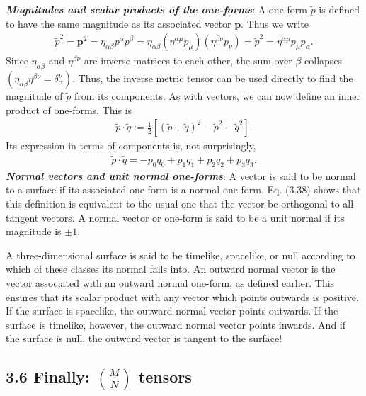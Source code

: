 \documentclass[11pt,letterpaper]{book}
\begin{document}
    \textit{\textbf{Magnitudes and scalar products of the one-forms}}: 
    A one-form \(\tilde{p}\) is defined to have the same magnitude as its associated vector \(\mathbf{p}\). Thus we write
    \begin{align}
    \tilde{p}^2 = \mathbf{p}^2 = \eta_{\alpha\beta} p^\alpha p^\beta = \eta_{\alpha\beta} (\eta^{\alpha\mu} p_\mu)(\eta^{\beta\nu} p_\nu) = \tilde{p}^2 = \eta^{\alpha\mu} p_\mu p_\alpha. \tag{3.50}
    \end{align}
    Since \(\eta_{\alpha\beta}\) and \(\eta^{\beta\nu}\) are inverse matrices to each other, the sum over \(\beta\) collapses \((\eta_{\alpha\beta}\eta^{\beta\nu} = \delta^\nu_\alpha)\). Thus, the inverse metric tensor can be used directly to find the magnitude of \(\tilde{p}\) from its components.
    As with vectors, we can now define an inner product of one-forms. This is
    \begin{align}
    \tilde{p} \cdot \tilde{q} := \frac{1}{2} \left[ (\tilde{p} + \tilde{q})^2 - \tilde{p}^2 - \tilde{q}^2 \right]. \tag{3.52}
    \end{align}
    Its expression in terms of components is, not surprisingly,
    \begin{align}
    \tilde{p} \cdot \tilde{q} = -p_0 q_0 + p_1 q_1 + p_2 q_2 + p_3 q_3. \tag{3.53}
    \end{align}
    \textit{\textbf{Normal vectors and unit normal one-forms}}:
    A vector is said to be normal to a surface if its associated one-form is a normal one-form. Eq. (3.38) shows that this definition is equivalent to the usual one that the vector be orthogonal to all tangent vectors. A normal vector or one-form is said to be a unit normal if its magnitude is \(\pm 1\).

    A three-dimensional surface is said to be timelike, spacelike, or null according to which of these classes its normal falls into. An outward normal vector is the vector associated with an outward normal one-form, as defined earlier. This ensures that its scalar product with any vector which points outwards is positive. If the surface is spacelike, the outward normal vector points outwards. If the surface is timelike, however, the outward normal vector points inwards. And if the surface is null, the outward vector is tangent to the surface!

    \subsection{3.6 Finally: \(\binom{M}{N}\) tensors}
\end{document}
